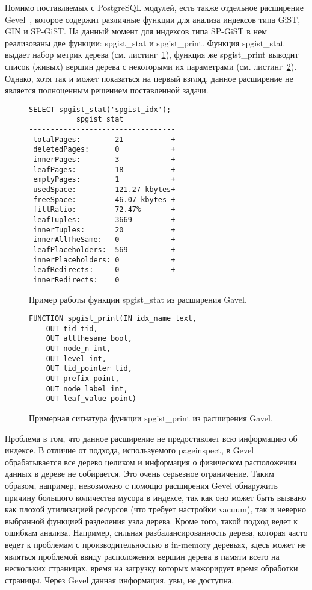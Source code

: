 \documentclass[12pt,oneside]{amsart}
\begin{document}
Помимо поставляемых с PostgreSQL модулей, есть также отдельное расширение Gevel~\cite{gevel}, которое содержит различные функции для анализа индексов типа GiST, GIN и SP-GiST. На данный момент для индексов типа SP-GiST в нем реализованы две функции: spgist\_stat и spgist\_print. Функция spgist\_stat выдает набор метрик дерева (см. листинг~\ref{gavel_stat}), функция же spgist\_print выводит список (живых) вершин дерева с некоторыми их параметрами (см. листинг~\ref{gavel_print}). Однако, хотя так и может показаться на первый взгляд, данное расширение не является полноценным решением поставленной задачи.

\lstset{
	language=SQL
}

\begin{figure}[ht]
\begin{lstlisting}
SELECT spgist_stat('spgist_idx');
           spgist_stat
----------------------------------
 totalPages:        21           +
 deletedPages:      0            +
 innerPages:        3            +
 leafPages:         18           +
 emptyPages:        1            +
 usedSpace:         121.27 kbytes+
 freeSpace:         46.07 kbytes +
 fillRatio:         72.47%       +
 leafTuples:        3669         +
 innerTuples:       20           +
 innerAllTheSame:   0            +
 leafPlaceholders:  569          +
 innerPlaceholders: 0            +
 leafRedirects:     0            +
 innerRedirects:    0
\end{lstlisting}
\caption{Пример работы функции spgist\_stat из расширения Gavel.}\label{gavel_stat}
\end{figure}

\begin{figure}[ht]
\begin{lstlisting}
FUNCTION spgist_print(IN idx_name text,
	OUT tid tid,
	OUT allthesame bool,
	OUT node_n int,
	OUT level int,
	OUT tid_pointer tid,
	OUT prefix point,
	OUT node_label int,
	OUT leaf_value point)
\end{lstlisting}
\caption{Примерная сигнатура функции spgist\_print из расширения Gavel.}\label{gavel_print}
\end{figure}

\lstset{
	language=C
}

Проблема в том, что данное расширение не предоставляет всю информацию об индексе. В отличие от подхода, используемого pageinspect, в Gevel обрабатывается все дерево целиком и информация о физическом расположении данных в дереве не собирается. Это очень серьезное ограничение. Таким образом, например, невозможно с помощю расширения Gevel обнаружить причину большого количества мусора в индексе, так как оно может быть вызвано как плохой утилизацией ресурсов (что требует настройки vacuum), так и неверно выбранной функцией разделения узла дерева. Кроме того, такой подход ведет к ошибкам анализа. Например, сильная разбалансированность дерева, которая часто ведет к проблемам с производительностью в in-memory деревьях, здесь может не являться проблемой ввиду расположения вершин дерева в памяти всего на нескольких страницах, время на загрузку которых мажорирует время обработки страницы. Через Gevel данная информация, увы, не доступна.
\end{document}
